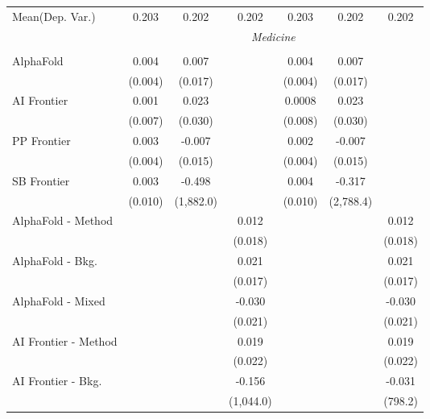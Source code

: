 \begin{tabular}{lcccccc}
Mean(Dep. Var.) & 0.203 & 0.202 & 0.202 & 0.203 & 0.202 & 0.202 \\
 & \multicolumn{6}{c}{\textit{Medicine}} \\ \\
   AlphaFold            & 0.004   & 0.007     &               & 0.004   & 0.007     &   \\   
                        & (0.004) & (0.017)   &               & (0.004) & (0.017)   &   \\   
   AI Frontier          & 0.001   & 0.023     &               & 0.0008  & 0.023     &   \\   
                        & (0.007) & (0.030)   &               & (0.008) & (0.030)   &   \\   
   PP Frontier          & 0.003   & -0.007    &               & 0.002   & -0.007    &   \\   
                        & (0.004) & (0.015)   &               & (0.004) & (0.015)   &   \\   
   SB Frontier          & 0.003   & -0.498    &               & 0.004   & -0.317    &   \\   
                        & (0.010) & (1,882.0) &               & (0.010) & (2,788.4) &   \\   
   AlphaFold - Method   &         &           & 0.012         &         &           & 0.012\\   
                        &         &           & (0.018)       &         &           & (0.018)\\   
   AlphaFold - Bkg.     &         &           & 0.021         &         &           & 0.021\\   
                        &         &           & (0.017)       &         &           & (0.017)\\   
   AlphaFold - Mixed    &         &           & -0.030        &         &           & -0.030\\   
                        &         &           & (0.021)       &         &           & (0.021)\\   
   AI Frontier - Method &         &           & 0.019         &         &           & 0.019\\   
                        &         &           & (0.022)       &         &           & (0.022)\\   
   AI Frontier - Bkg.   &         &           & -0.156        &         &           & -0.031\\   
                        &         &           & (1,044.0)     &         &           & (798.2)\\   

\end{tabular}
